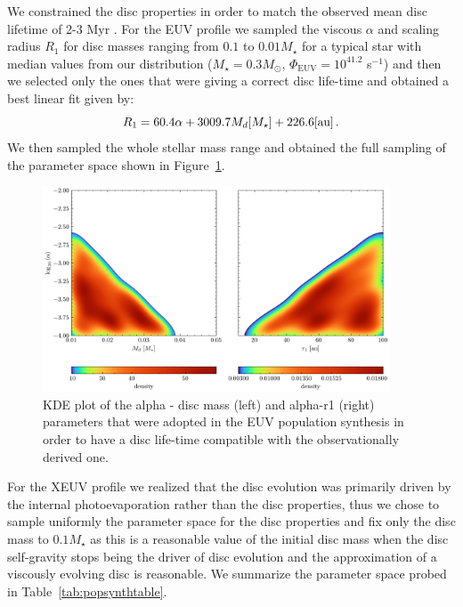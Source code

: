 \documentclass[fleqn,usenatbib,letters]{mnras}
\begin{document}
We constrained the disc properties in order to match the observed mean disc lifetime of 2-3 Myr \citep[see e.g.][]{Ribas2014}. For the EUV profile we sampled the viscous $\alpha$ and scaling radius $R_1$ for disc masses ranging from $0.1$ to $0.01 M_\star$ for a typical star with median values from our distribution ($M_\star = 0.3 M_\odot$, $\Phi_\mathrm{EUV} = 10^{41.2}$ s$^{-1}$) and then we selected only the ones that were giving a correct disc life-time and obtained a best linear fit given by:
\begin{equation}
    R_1 = 60.4 \alpha + 3009.7 M_d [M_\star] + 226.6 \\\text{[au]} \,.
\end{equation}
We then sampled the whole stellar mass range and obtained the full sampling of the parameter space shown in Figure~\ref{fig:param_euv}.
\begin{figure}
    \includegraphics[width=0.92\textwidth]{parameter_space_EUV.png}
    \caption{KDE plot of the alpha - disc mass (left) and alpha-r1 (right) parameters that were adopted in the EUV population synthesis in order to have a disc life-time compatible with the observationally derived one. \label{fig:param_euv}}
\end{figure}
For the XEUV profile we realized that the disc evolution was primarily driven by the internal photoevaporation rather than the disc properties, thus we chose to sample uniformly the parameter space for the disc properties and fix only the disc mass to $0.1 M_\star$ as this is a reasonable value of the initial disc mass when the disc self-gravity stops being the driver of disc evolution and the approximation of a viscously evolving disc is reasonable. We summarize the parameter space probed in Table~\ref{tab:popsynthtable}.
\end{document}
